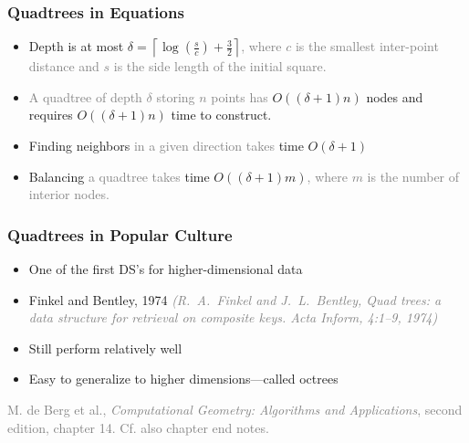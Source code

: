 \documentclass{beamer}
\begin{document}
\begin{frame}
  \frametitle{Quadtrees in Equations}
  
  \begin{itemize}
  \item Depth is at most $\delta = \left\lceil
      \log\left(\frac{s}{c}\right) +
      \frac{3}{2}\right\rceil$\textcolor{gray}{, where $c$ is the
      smallest inter-point distance and $s$ is the side length of the
      initial square.} \\[2mm]
    
  \item \textcolor{gray}{A quadtree of depth $\delta$ storing $n$ points has}
    $O((\delta+1)n)$ nodes and requires $O((\delta+1)n)$ time to
    construct. \\[2mm]
    
  \item Finding neighbors \textcolor{gray}{in a given direction takes}
    time $O(\delta+1)$ \\[2mm]

  \item Balancing \textcolor{gray}{a quadtree takes} time
    $O((\delta+1)m)$\textcolor{gray}{, where $m$ is the number of
      interior nodes.}

  \end{itemize}
\end{frame}

\begin{frame}
  \frametitle{Quadtrees in Popular Culture}

  \begin{itemize}
  \item One of the first DS's for higher-dimensional data
  \item Finkel and Bentley, 1974
    \textcolor{gray}{\small\it(R.~A.~Finkel and J.~L.~Bentley, Quad
      trees: a data structure for retrieval on composite keys. Acta
      Inform, 4:1--9, 1974)}
  \item Still perform relatively well
  \item Easy to generalize to higher dimensions---called octrees
  \end{itemize}

  \bigskip \textcolor{gray}{M. de Berg et al., \textit{Computational
      Geometry: Algorithms and Applications}, second edition, chapter
    14.  Cf. also chapter end notes.}
\end{frame}
\end{document}
